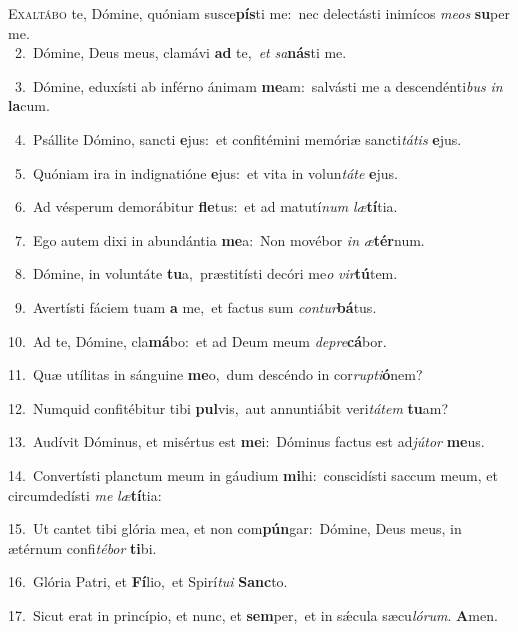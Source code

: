 \lettrine{\initial\textcolor{\initialcolor}{E}}{xaltábo} te, Dómine, quóniam susce\-\textbf{pís}\-ti me:~\star nec delectásti inimícos \textit{me}\-\textit{os} \textbf{su}\-per me.\\
{\numbfont\textcolor{\numbcolor}{~2.}}~Dómine, Deus meus, clamávi \textbf{ad} te,~\star \textit{et} \textit{sa}\-\textbf{nás}ti me.\par
{\numbfont\textcolor{\numbcolor}{~3.}}~Dómine, eduxísti ab inférno ánimam \textbf{me}\-am:~\star salvásti me a descendénti\textit{bus} \textit{in} \textbf{la}\-cum.\par
{\numbfont\textcolor{\numbcolor}{~4.}}~Psállite Dómino, sancti \textbf{e}\-jus:~\star et confitémini memóriæ sancti\-\textit{tá}\-\textit{tis} \textbf{e}\-jus.\par
{\numbfont\textcolor{\numbcolor}{~5.}}~Quóniam ira in indignatióne \textbf{e}\-jus:~\star et vita in volun\-\textit{tá}\-\textit{te} \textbf{e}\-jus.\par
{\numbfont\textcolor{\numbcolor}{~6.}}~Ad vésperum demorábitur \textbf{fle}\-tus:~\star et ad matutí\textit{num} \textit{læ}\-\textbf{tí}tia.\par
{\numbfont\textcolor{\numbcolor}{~7.}}~Ego autem dixi in abundántia \textbf{me}\-a:~\star Non movébor \textit{in} \textit{æ}\-\textbf{tér}num.\par
{\numbfont\textcolor{\numbcolor}{~8.}}~Dómine, in voluntáte \textbf{tu}\-a,~\star præstitísti decóri me\textit{o} \textit{vir}\-\textbf{tú}tem.\par
{\numbfont\textcolor{\numbcolor}{~9.}}~Avertísti fáciem tuam \textbf{a} me,~\star et factus sum \textit{con}\-\textit{tur}\textbf{bá}tus.\par
{\numbfont\textcolor{\numbcolor}{10.}}~Ad te, Dómine, cla\-\textbf{má}\-bo:~\star et ad Deum meum \textit{de}\-\textit{pre}\textbf{cá}bor.\par
{\numbfont\textcolor{\numbcolor}{11.}}~Quæ utílitas in sánguine \textbf{me}\-o,~\star dum descéndo in cor\-\textit{rup}\-\textit{ti}\textbf{ó}nem?\par
{\numbfont\textcolor{\numbcolor}{12.}}~Numquid confitébitur tibi \textbf{pul}\-vis,~\star aut annuntiábit veri\-\textit{tá}\-\textit{tem} \textbf{tu}\-am?\par
{\numbfont\textcolor{\numbcolor}{13.}}~Audívit Dóminus, et misértus est \textbf{me}\-i:~\star Dóminus factus est ad\-\textit{jú}\-\textit{tor} \textbf{me}\-us.\par
{\numbfont\textcolor{\numbcolor}{14.}}~Convertísti planctum meum in gáudium \textbf{mi}\-hi:~\star conscidísti saccum meum, et circumdedísti \textit{me} \textit{læ}\-\textbf{tí}tia:\par
{\numbfont\textcolor{\numbcolor}{15.}}~Ut cantet tibi glória mea, et non com\-\textbf{pún}\-gar:~\star Dómine, Deus meus, in ætérnum confi\-\textit{té}\-\textit{bor} \textbf{ti}\-bi.\par
{\numbfont\textcolor{\numbcolor}{16.}}~Glória Patri, et \textbf{Fí}\-lio,~\star et Spirí\-\textit{tu}\-\textit{i} \textbf{Sanc}\-to.\par
{\numbfont\textcolor{\numbcolor}{17.}}~Sicut erat in princípio, et nunc, et \textbf{sem}\-per,~\star et in sǽcula sæcu\-\textit{ló}\-\textit{rum}. \textbf{A}\-men.\par
